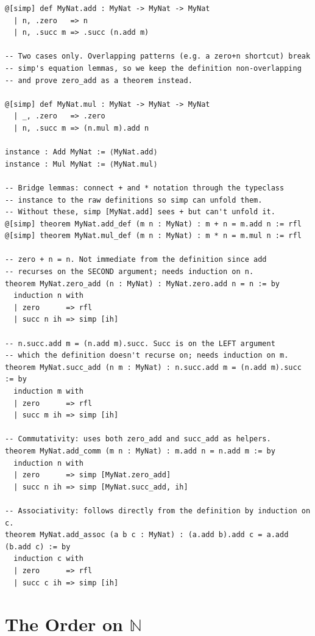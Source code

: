 \documentclass[12pt, openany]{book}
\theoremstyle{plain}
\theoremstyle{definition}
\theoremstyle{remark}
\newcommand{\N}{\mathbb{N}}
\begin{document}
\begin{leanbox}
\begin{lstlisting}
@[simp] def MyNat.add : MyNat -> MyNat -> MyNat
  | n, .zero   => n
  | n, .succ m => .succ (n.add m)

-- Two cases only. Overlapping patterns (e.g. a zero+n shortcut) break
-- simp's equation lemmas, so we keep the definition non-overlapping
-- and prove zero_add as a theorem instead.

@[simp] def MyNat.mul : MyNat -> MyNat -> MyNat
  | _, .zero   => .zero
  | n, .succ m => (n.mul m).add n

instance : Add MyNat := ⟨MyNat.add⟩
instance : Mul MyNat := ⟨MyNat.mul⟩

-- Bridge lemmas: connect + and * notation through the typeclass
-- instance to the raw definitions so simp can unfold them.
-- Without these, simp [MyNat.add] sees + but can't unfold it.
@[simp] theorem MyNat.add_def (m n : MyNat) : m + n = m.add n := rfl
@[simp] theorem MyNat.mul_def (m n : MyNat) : m * n = m.mul n := rfl

-- zero + n = n. Not immediate from the definition since add
-- recurses on the SECOND argument; needs induction on n.
theorem MyNat.zero_add (n : MyNat) : MyNat.zero.add n = n := by
  induction n with
  | zero      => rfl
  | succ n ih => simp [ih]

-- n.succ.add m = (n.add m).succ. Succ is on the LEFT argument
-- which the definition doesn't recurse on; needs induction on m.
theorem MyNat.succ_add (n m : MyNat) : n.succ.add m = (n.add m).succ := by
  induction m with
  | zero      => rfl
  | succ m ih => simp [ih]

-- Commutativity: uses both zero_add and succ_add as helpers.
theorem MyNat.add_comm (m n : MyNat) : m.add n = n.add m := by
  induction n with
  | zero      => simp [MyNat.zero_add]
  | succ n ih => simp [MyNat.succ_add, ih]

-- Associativity: follows directly from the definition by induction on c.
theorem MyNat.add_assoc (a b c : MyNat) : (a.add b).add c = a.add (b.add c) := by
  induction c with
  | zero      => rfl
  | succ c ih => simp [ih]
\end{lstlisting}
\end{leanbox}
\color{black}

\section{The Order on \texorpdfstring{$\N$}{N}}
\end{document}
